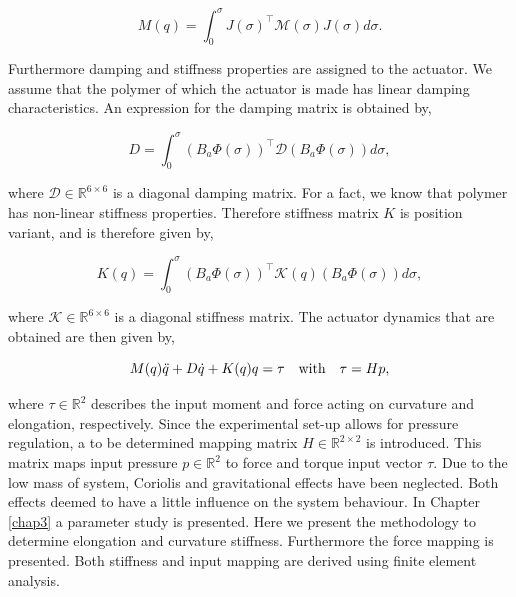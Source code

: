 \begin{equation}
    M(q) = \int_0^{\sigma} J(\sigma)^\top \mathcal{M}(\sigma)J(\sigma) d \sigma.
\end{equation}

Furthermore damping and stiffness properties are assigned to the actuator. We assume that the polymer of which the actuator is made has linear damping characteristics. An expression for the damping matrix is obtained by,

\begin{equation}
    D = \int_0^\sigma (B_a \Phi(\sigma))^\top  \mathcal{D} (B_a \Phi(\sigma)) d\sigma,
\end{equation}

where $\mathcal{D} \in \mathbb{R}^{6 \times 6}$ is a diagonal damping matrix. For a fact, we know that polymer has non-linear stiffness properties. Therefore stiffness matrix $K$ is position variant, and is therefore given by,

\begin{equation}
    K(q) = \int_0^\sigma (B_a \Phi(\sigma) )^\top \mathcal{K}(q) (B_a \Phi(\sigma))  d\sigma,
\end{equation}

where $\mathcal{K} \in \mathbb{R}^{6 \times 6}$ is a diagonal stiffness matrix. The actuator dynamics that are obtained are then given by,

\begin{equation}
    M(q)\Ddot{q} + D\dot{q} + K(q)q = \tau  \hspace{10pt} \text{with} \hspace{10pt} \tau = Hp,
    \label{eq2:simp_model}
\end{equation}

where $\tau \in \mathbb{R}^2$ describes the input moment and force acting on curvature and elongation, respectively. Since the experimental set-up allows for pressure regulation, a to be determined mapping matrix $H \in \mathbb{R}^{2\times2}$ is introduced. This matrix maps input pressure $p \in \mathbb{R}^2$ to force and torque input vector $\tau$. Due to the low mass of system, Coriolis and gravitational effects have been neglected. Both effects deemed to have a little influence on the system behaviour. In Chapter \ref{chap3} a parameter study is presented. Here we present the methodology to determine elongation and curvature stiffness. Furthermore the force mapping is presented. Both stiffness and input mapping are derived using finite element analysis.



